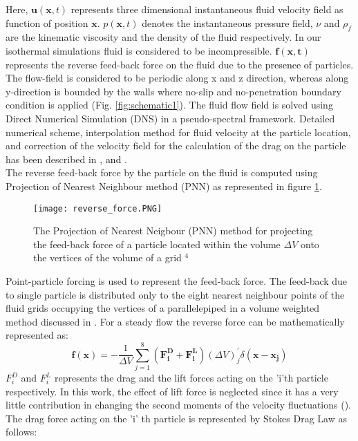 \documentclass[aip,graphicx]{revtex4-1}
\begin{document}
	Here, $\mathbf{u}(\mathbf{x},t)$ represents three dimensional instantaneous fluid velocity field as function of position $\mathbf{x}$. $p(\mathbf{x},t)$ denotes the  instantaneous pressure field, $\nu$ and $\rho_f$ are the kinematic viscosity and the density of the fluid respectively. In our isothermal simulations fluid is considered to be incompressible. $\mathbf{f(\mathbf{x},t)}$ represents the reverse feed-back force on the fluid due to \textcolor{black}{the presence of} particles.  
	The flow-field is considered to be periodic along x and z direction, whereas along y-direction is bounded by the walls where no-slip and no-penetration boundary condition is applied (Fig. \ref{fig:schematic1}). The fluid flow field is  solved using Direct Numerical Simulation (DNS) in a  pseudo-spectral framework. Detailed numerical scheme, interpolation method for fluid velocity at the particle location, and correction of the velocity field for the calculation of the drag on the particle has been described in \textcolor{black}{\citet{goswami2010particle1}, \citet{muramulla2020disruption} and \citet{Pradeep_2022}}  .
  \\The reverse feed-back force by the particle on the fluid is computed using Projection of Nearest Neighbour method (PNN) as represented in figure \ref{PNN}.
  \begin{figure}[h]
		\centering
\texttt{[image: reverse\_force.PNG]} 
 \caption{The Projection of Nearest Neigbour (PNN) method for projecting the feed-back force of a particle located within the volume $\Delta V$ onto the vertices of the volume of a grid $^4$}
 \label{PNN}
 \end{figure}
  Point-particle forcing is used to represent the feed-back force. The feed-back due to single particle is distributed only to the eight nearest neighbour points of the fluid grids occupying the vertices of a parallelepiped in a volume weighted method discussed in \citet{muramulla2020disruption}. For a steady flow the reverse force can be mathematically represented as:
  \begin{equation}
    \mathbf{f(\mathbf{x})}=-\frac{1}{\Delta V}\sum_{j=1}^{8}(\mathbf{F_i^D}+\mathbf{F_i^L})(\Delta V)^{\prime}_j\delta(\mathbf{x}-\mathbf{x_j})  
  \end{equation}
  $F_i^D$ and $F_i^L$ represents the drag and the lift forces acting on the 'i'th particle respectively. In this work, the effect of lift force is neglected since it has a very little contribution in changing the second moments of the velocity fluctuations (\citet{muramulla2020disruption}). The drag force acting on the 'i' th particle is represented by Stokes Drag Law as follows:
\end{document}
